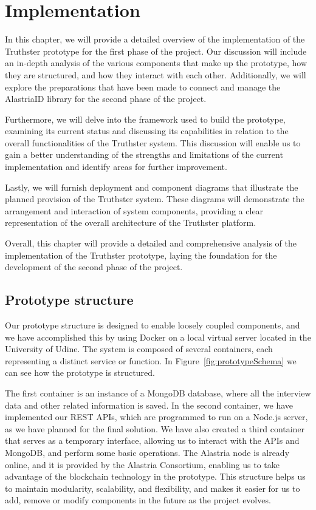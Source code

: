 \documentclass[target=mst,aauheader=]{thud}
\begin{document}
\chapter{Implementation}
\label{chapter:implementation}

In this chapter, we will provide a detailed overview of the implementation of the Truthster prototype for the first phase of the project. Our discussion will include an in-depth analysis of the various components that make up the prototype, how they are structured, and how they interact with each other. Additionally, we will explore the preparations that have been made to connect and manage the AlastriaID library for the second phase of the project.\par
Furthermore, we will delve into the framework used to build the prototype, examining its current status and discussing its capabilities in relation to the overall functionalities of the Truthster system. This discussion will enable us to gain a better understanding of the strengths and limitations of the current implementation and identify areas for further improvement.\par
Lastly, we will furnish deployment and component diagrams that illustrate the planned provision of the Truthster system. These diagrams will demonstrate the arrangement and interaction of system components, providing a clear representation of the overall architecture of the Truthster platform.\par
Overall, this chapter will provide a detailed and comprehensive analysis of the implementation of the Truthster prototype, laying the foundation for the development of the second phase of the project.

\section{Prototype structure}

Our prototype structure is designed to enable loosely coupled components, and we have accomplished this by using Docker \cite{docker} on a local virtual server located in the University of Udine. The system is composed of several containers, each representing a distinct service or function. In Figure~\ref{fig:prototypeSchema} we can see how the prototype is structured.\par 
The first container is an instance of a MongoDB database, where all the interview data and other related information is saved. In the second container, we have implemented our REST APIs, which are programmed to run on a Node.js server, as we have planned for the final solution. We have also created a third container that serves as a temporary interface, allowing us to interact with the APIs and MongoDB, and perform some basic operations. The Alastria node is already online, and it is provided by the Alastria Consortium, enabling us to take advantage of the blockchain technology in the prototype. This structure helps us to maintain modularity, scalability, and flexibility, and makes it easier for us to add, remove or modify components in the future as the project evolves.
\end{document}
